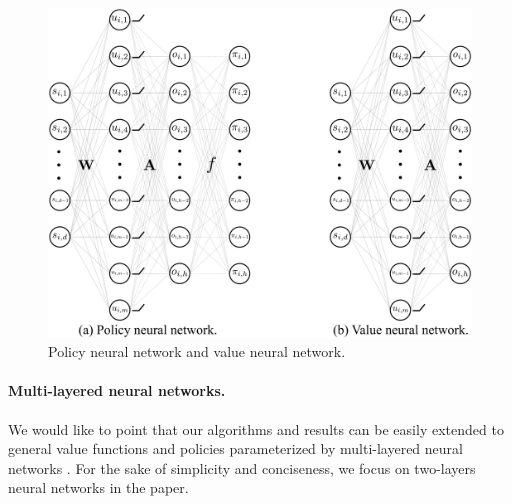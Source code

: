 \begin{figure}[t]
	\vskip 0.2in
	\begin{center}
		\centerline{\includegraphics[width=\columnwidth]{nn_policy_value_vertical.pdf}}
		\caption{Policy neural network and value neural network.}
		\label{fig:nn_policy_value}
	\end{center}
	\vskip -0.2in
\end{figure}


\paragraph{Multi-layered neural networks.} We would like to point that our algorithms and results can be easily extended to general value functions and policies parameterized by multi-layered neural networks \citep{allen2018convergenceA,allen2018convergenceB,du2018gradientA}. For the sake of simplicity and conciseness, we focus on two-layers neural networks in the paper.


